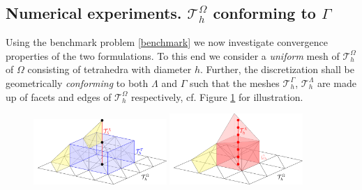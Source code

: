 \documentclass[r]{siamart171218}
\begin{document}
\subsection{Numerical experiments. $\mathcal{T}^{\Omega}_h$ conforming to $\Gamma$}\label{sec:experiment_conform}
Using the benchmark problem \eqref{benchmark} we now investigate convergence
properties of the two formulations. To this end we consider a \emph{uniform} mesh
of $\mathcal{T}^{\Omega}_h$ of $\Omega$ consisting of tetrahedra with diameter $h$.
Further, the discretization shall be geometrically \emph{conforming} to both $\Lambda$
and $\Gamma$ such that the meshes $\mathcal{T}^{\Gamma}_h$, $\mathcal{T}^{\Lambda}_h$
are made up of facets and edges of $\mathcal{T}^{\Omega}_h$ respectively, cf. Figure \ref{fig:mesh}
for illustration.


\begin{figure}
 \centering
 \includegraphics[width=0.45\textwidth]{graphics/conform_mesh.pdf}
 \includegraphics[width=0.45\textwidth]{graphics/nonconform_mesh.pdf} 
 \vspace{-10pt}
\label{fig:mesh}
\end{figure}
\end{document}
